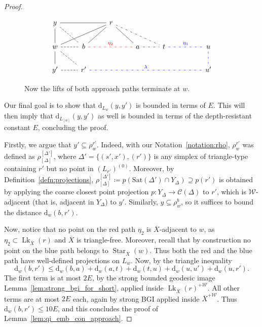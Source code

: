 \documentclass[svgnames]{amsart}
\theoremstyle{plain}
\theoremstyle{definition}
\newcommand{\C}{\mathcal C}
\newcommand{\ov}[1]{\overline{#1}}
\newcommand{\dist}{\mathrm{d}}
\newcommand{\link}{\operatorname{Lk}}
\newcommand{\Sat}{\mathrm{Sat}}
\newcommand{\W}{\mathcal{W}}
\begin{document}
\begin{proof}
\begin{figure}[htp]
    \centering
    $$\begin{tikzcd}
        {y}\ar[rd, dashed, no head]
        &&{r}\ar[dll, no head] \ar[ll, no head] \ar[dl, no head]  \ar[dr, no head] \ar[drr, no head, dash dot]\\
        {w}\ar[d, no head]\ar[dr, dashed, no head] \ar[r, dashed, no head] \ar[u, no head] & {b} \ar[rr, dash dot, red, no head, "\eta_2"]&&{a}\ar[r, no head, dash dot]& {t}\ar[rr, dash dot, no head, "\eta_1", blue] && {u}\ar[d, dash dot, no head, blue]\\
        {y'}  \ar[r, dashed, no head]& {r'} \ar[rrrrr, dash dot, no head, "\lambda", blue]&&&&& u'
    \end{tikzcd}$$
    \caption{Now the lifts of both approach paths terminate at $w$.}
    \label{fig:2_glued_approach_paths}
\end{figure}


Our final goal is to show that $\dist_{L_w}(y,y')$ is bounded in terms of $E$. This will then imply that $\dist_{L_{[w]}}(y,y')$ as well is bounded in terms of the depth-resistant constant $E$, concluding the proof.
\par\medskip

Firstly, we argue that $y'\subseteq \rho^{r'}_w$. Indeed, with our Notation~\ref{notation:rho}, 
$\rho^{r'}_w$ was defined as $\rho^{[\Delta']}_{[\Delta]}$, where $\Delta'=\{(s', x'), (r')\}$ is any simplex of triangle-type containing $r'$ but no point in $(L_{r'})^{(0)}$. Moreover, by Definition~\ref{defn:projections}, $\rho^{[\Delta']}_{[\Delta]}\coloneq p(\Sat(\Delta')\cap Y_\Delta)\supseteq p(r')$ is obtained by applying the coarse closest point projection $p\colon Y_{\Delta}\to \C(\Delta)$ to $r'$, which is $\W$-adjacent (that is, adjacent in $Y_{\Delta}$) to $y'$. Similarly, $y\subseteq \rho^{b}_w$, so it suffices to bound the distance $\dist_{w}(b,r')$. 

Now, notice that no point on the red path $\eta_2$ is $\ov X$-adjacent to $w$, as $\eta_2\subset\link_{\ov X}(r)$ and $\ov X$ is triangle-free. Moreover, recall that by construction no point on the blue path belongs to $\operatorname{Star}_{\ov X}(w)$. Thus both the red and the blue path have well-defined projections on $L_w$. Now, by the triangle inequality
$$\dist_{w}(b,r')\le \dist_{w}(b,a)+\dist_{w}(a,t)+\dist_{w}(t,u)+\dist_{w}(u, u')+\dist_{w}(u,r').$$
The first term is at most $2E$, by the strong bounded geodesic image Lemma~\ref{lem:strong_bgi_for_short}, applied inside $\link_{\ov X}(r)^{+\W}$. All other terms are at most $2E$ each, again by strong BGI applied inside $\ov X^{+\W}$. Thus $\dist_{w}(b,r')\le 10E$, and this concludes the proof of Lemma~\ref{lem:qi_emb_con_approach}.
\end{proof}
\end{document}
